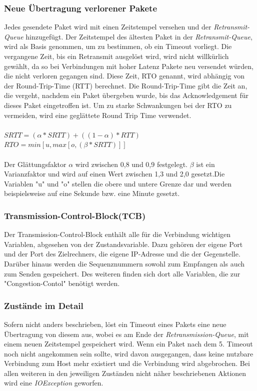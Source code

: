 \subsubsection{Neue Übertragung verlorener Pakete}
Jedes gesendete Paket wird mit einen Zeitstempel versehen und der \textit{Retransmit-Queue} hinzugefügt. Der Zeitstempel des ältesten Paket in der \textit{Retransmit-Queue}, wird als Basis genommen, um zu bestimmen, ob ein Timeout vorliegt. Die vergangene Zeit, bis ein Retransmit ausgelöst wird, wird nicht willkürlich gewählt, da so bei Verbindungen mit hoher Latenz Pakete neu versendet würden, die nicht verloren gegangen sind. Diese Zeit, RTO genannt, wird abhängig von der Round-Trip-Time (RTT) berechnet. Die Round-Trip-Time gibt die Zeit an, die vergeht, nachdem ein Paket übergeben wurde, bis das Acknowledgement für dieses Paket eingetroffen ist.  Um zu starke Schwankungen bei der RTO zu vermeiden, wird eine geglättete Round Trip Time verwendet. \\\\
$SRTT = (\alpha * SRTT) + ((1-\alpha)*RTT)$\\
$RTO = min [u, max [o, (\beta *SRTT)]]$\\\\
Der Glättungsfaktor $\alpha$ wird zwischen 0,8 und 0,9 festgelegt. $\beta$ ist ein Varianzfaktor und wird auf einen Wert zwischen 1,3 und 2,0 gesetzt.Die Variablen "{}u"{} und "{}o"{} stellen die obere und untere Grenze dar und werden beispielsweise auf eine Sekunde bzw. eine Minute gesetzt.


\subsubsection{Transmission-Control-Block(TCB)}

Der Transmission-Control-Block enthält alle für die Verbindung wichtigen Variablen, abgesehen von der Zustandsvariable.  Dazu gehören der eigene Port und der Port des Zielrechners, die eigene IP-Adresse und die der Gegenstelle. Darüber hinaus werden die Sequenznummern sowohl zum Empfangen als auch zum Senden gespeichert.  Des weiteren finden sich dort alle Variablen, die zur "{}Congestion-Contol"{} benötigt werden.  


\subsubsection{Zustände im Detail}
Sofern nicht anders beschrieben, löst ein Timeout eines Pakets eine neue Übertragung von diesem aus, wobei es am Ende der \textit{Retransmission-Queue}, mit einem neuen Zeitstempel gespeichert wird. Wenn ein Paket nach dem 5. Timeout noch nicht angekommen sein sollte, wird davon ausgegangen, dass keine nutzbare Verbindung zum Host mehr existiert und die Verbindung wird abgebrochen. 
Bei allen weiteren in den jeweiligen Zuständen nicht näher beschriebenen Aktionen wird eine \textit{IOException} geworfen.

